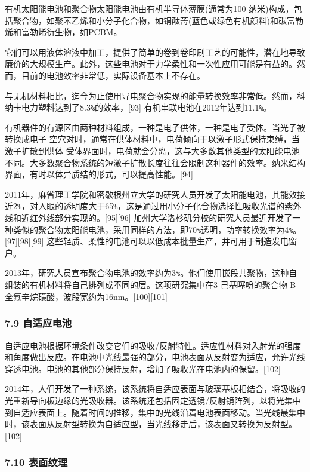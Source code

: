 有机太阳能电池和聚合物太阳能电池由有机半导体薄膜(通常为100 纳米)构成，包括聚合物，如聚苯乙烯和小分子化合物，如铜酞菁(蓝色或绿色有机颜料)和碳富勒烯和富勒烯衍生物，如PCBM。

它们可以用液体溶液中加工，提供了简单的卷到卷印刷工艺的可能性，潜在地导致廉价的大规模生产。此外，这些电池对于力学柔性和一次性应用可能是有益的。然而，目前的电池效率非常低，实际设备基本上不存在。

与无机材料相比，迄今为止使用导电聚合物实现的能量转换效率非常低。然而，科纳卡电力塑料达到了8.3\verb|%|的效率，[93] 有机串联电池在2012年达到11.1\verb|%|。

有机器件的有源区由两种材料组成，一种是电子供体，一种是电子受体。当光子被转换成电子-空穴对时，通常在供体材料中，电荷倾向于以激子形式保持束缚，当激子扩散到供体-受体界面时，电荷就会分离，这与大多数其他类型的太阳能电池不同。大多数聚合物系统的短激子扩散长度往往会限制这种器件的效率。纳米结构界面，有时以体异质结的形式，可以提高性能。[94]

2011年，麻省理工学院和密歇根州立大学的研究人员开发了太阳能电池，其能效接近2\verb|%|，对人眼的透明度大于65\verb|%|，这是通过用小分子化合物选择性吸收光谱的紫外线和近红外线部分实现的。[95][96] 加州大学洛杉矶分校的研究人员最近开发了一种类似的聚合物太阳能电池，采用同样的方法，即70\verb|%|透明，功率转换效率为4\verb|%|。[97][98][99] 这些轻质、柔性的电池可以以低成本批量生产，并可用于制造发电窗户。

2013年，研究人员宣布聚合物电池的效率约为3\verb|%|。他们使用嵌段共聚物，这种自组装的有机材料将自己排列成不同的层。这项研究集中在3-己基噻吩的聚合物-B-全氟辛烷磺酸，波段宽约为16nm。[100][101]

\subsubsection{7.9 自适应电池}

自适应电池根据环境条件改变它们的吸收/反射特性。适应性材料对入射光的强度和角度做出反应。在电池中光线最强的部分，电池表面从反射变为适应，允许光线穿透电池。电池的其他部分保持反射，增加了吸收光在电池内的保留。[102]

2014年，人们开发了一种系统，该系统将自适应表面与玻璃基板相结合，将吸收的光重新导向板边缘的光吸收器。该系统还包括固定透镜/反射镜阵列，以将光集中到自适应表面上。随着时间的推移，集中的光线沿着电池表面移动。当光线最集中时，该表面从反射型转换为自适应型，当光线移走后，该表面又转换为反射型。[102]

\subsubsection{7.10 表面纹理}

